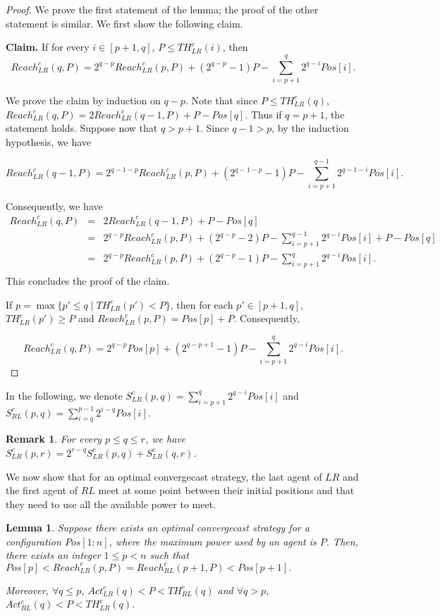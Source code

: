 \documentclass{article}
\newtheorem{lemma}{Lemma}
\newtheorem{remark}{Remark}
\newcommand\rclr{Reach_{LR}^c\xspace}
\newcommand\rcrl{Reach_{RL}^c\xspace}
\newcommand\acrl{Act_{RL}^c\xspace}
\newcommand\aclr{Act_{LR}^c\xspace}
\newcommand\tclr{TH_{LR}^c\xspace}
\newcommand\tcrl{TH_{RL}^c\xspace}
\newcommand\sclr{S_{LR}^c\xspace}
\newcommand\scrl{S_{RL}^c\xspace}
\newcommand\convergecast{convergecast\xspace}
\begin{document}
\begin{proof}
We prove the first statement of the lemma; the proof of the other statement is similar.  We
first show the following claim.
 
\noindent \textbf{Claim.}
If for every $i \in [p+1,q]$, $P
\leq \tclr(i)$, then $$\rclr(q,P) = 2^{q-p}\rclr(p,P) +
(2^{q-p}-1)P - \sum_{i=p+1}^{q} 2^{q-i}Pos[i].$$

We prove the claim by induction on $q-p$.
Note that since $P \leq \tclr(q) $, $\rclr(q,P) =
2\rclr(q-1,P)+P-Pos[q]$.  Thus if $q = p+1$, the statement holds.
Suppose now that $q > p+1$.  Since $q-1 > p$, by the induction hypothesis,
we have

$$\rclr(q-1,P) = 2^{q-1-p}\rclr(p,P) + (2^{q-1-p}-1)P -
\sum_{i=p+1}^{q-1} 2^{q-1-i}Pos[i].$$  

Consequently, we have 
\begin{eqnarray*}
\rclr(q,P) &=& 2\rclr(q-1,P)+P-Pos[q]\\
&=&2^{q-p}\rclr(p,P) + (2^{q-p}-2)P - \sum_{i=p+1}^{q-1} 2^{q-i}Pos[i]+P-Pos[q] \\
&=&2^{q-p}\rclr(p,P) + (2^{q-p}-1)P -
\sum_{i=p+1}^{q} 2^{q-i}Pos[i].\\
\end{eqnarray*}
This concludes the proof of the claim.

If $p = \max \{p' \leq q \mid
\tclr(p') < P\}$, then for each $p' \in [p+1,q]$, $\tclr(p') \geq
P$ and $\rclr(p,P) = Pos[p]+P$. Consequently, 

$$\rclr(q,P) = 2^{q-p}Pos[p] +
(2^{q-p+1}-1)P - \sum_{i=p+1}^{q} 2^{q-i}Pos[i].$$
\end{proof}










In the following, we denote $\sclr(p,q) = \sum_{i=p+1}^{q}
2^{q-i}Pos[i]$ and $\scrl(p,q) = \sum_{i=q}^{p-1} 2^{i-q}Pos[i]$.

\begin{remark}\label{rem-SLR}
For every $p \leq q \leq r$, we have $\sclr(p,r) = 2^{r-q}\sclr(p,q)+\sclr(q,r)$.
\end{remark}


We now show that for an optimal {\convergecast} strategy, the last agent
of $LR$ and the first agent of $RL$ meet at some point between their initial
positions and that they need to use all the available power  to
meet. 

\begin{lemma}\label{lem-egalite-reach}
Suppose there exists an optimal {\convergecast} strategy for a
configuration $Pos[1:n]$, where the maximum power used by an agent is
$P$.  Then, there exists an integer $1 \leq p < n$ such that $Pos[p] <
\rclr(p,P) = \rcrl(p+1,P) < Pos[p+1].$

Moreover, $\forall q \leq p$, $\aclr(q) < P < \tcrl(q)$ and
$\forall q > p$, $\acrl(q) < P < \tclr(q)$.
\end{lemma}
\end{document}
